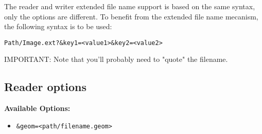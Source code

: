 The reader and writer extended file name support is based on the same syntax,
only the options are different.  To benefit from the extended file name
mecanism, the following syntax is to be used:

\begin{verbatim}
Path/Image.ext?&key1=<value1>&key2=<value2>
\end{verbatim}

IMPORTANT: Note that you'll probably need to "quote" the filename.

\subsection{Reader options}

\textbf{Available Options:}

\begin{itemize}

\item \begin{verbatim}&geom=<path/filename.geom>\end{verbatim}


\end{itemize}
